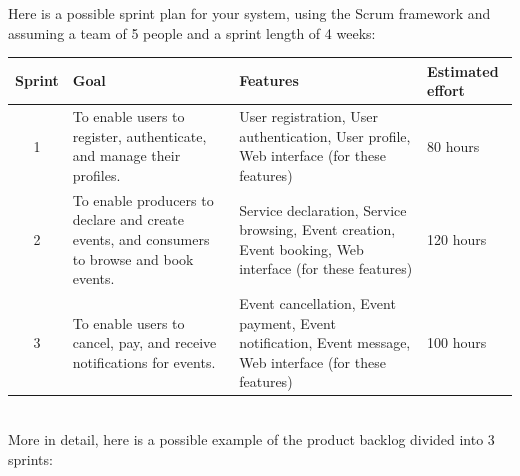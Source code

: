 \documentclass[a4paper,12pt]{article}
\begin{document}
\newpage\noindent
Here is a possible sprint plan for your system, using the Scrum framework and assuming a team of 5 people and a sprint length of 4 weeks:
\begin{table}[!h]
\centering
\begin{tabular}{|c|p{5cm}|p{7cm}|p{2cm}|}
\hline
\textbf{Sprint} & \textbf{Goal} & \textbf{Features}& \textbf{Estimated effort} \\
\hline
1 & To enable users to register, authenticate, and manage their profiles. & User registration, User authentication, User profile, Web interface (for these features) & 80 hours \\
\hline
2 & To enable producers to declare and create events, and consumers to browse and book events. & Service declaration, Service browsing, Event creation, Event booking, Web interface (for these features) & 120 hours \\
\hline
3 & To enable users to cancel, pay, and receive notifications for events. & Event cancellation, Event payment, Event notification, Event message, Web interface (for these features) & 100 hours \\
\hline
\end{tabular}
\end{table}\\
More in detail, here is a possible example of the product backlog divided into 3 sprints:
\end{document}
